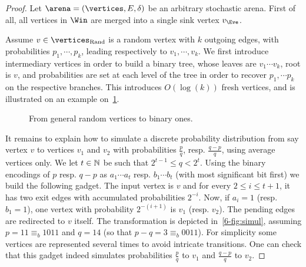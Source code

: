 \begin{proof}
Let $\arena = (\vertices,E,\delta)$ be an arbitrary stochastic
arena. First of all, all vertices in $\Win$ are merged into a single
sink vertex $v_\Eve$.

Assume $v \in \Randomvertices$ is a random vertex with $k$ outgoing
edges, with probabilities $p_1, \cdots, p_k$, leading respectively
to $v_1,\cdots,v_k$. We first introduce intermediary vertices in
order to build a binary tree, whose leaves are $v_1 \cdots v_k$,
root is $v$, and probabilities are set at each level of the tree in
order to recover $p_1, \cdots p_k$ on the respective branches. This
introduces $O(\log(k))$ fresh vertices, and is illustrated on an
example on~\cref{6-fig:gen2binary}.

\begin{figure}[htbp]
  \centering
\caption{From general random vertices to binary ones.}
  \label{6-fig:gen2binary}
\end{figure}

It remains to explain how to simulate a discrete probability
distribution from say vertex $v$ to vertices $v_1$ and $v_2$ with
probabilities $\frac{p}{q}$, resp.  $\frac{q-p}{q}$, using average
vertices only.  We let $t \in\mathbb{N}$ be such that
$2^{t-1} \leq q < 2^{t}$. Using the binary encodings of $p$ resp.
$q-p$ as $a_1 \cdots a_t$ resp. $b_1 \cdots b_t$ (with most
significant bit first) we build the following gadget. The input
vertex is $v$ and for every $2 \leq i \leq t+1$, it has two exit
edges with accumulated probabilities $2^{-i}$. Now, if $a_i=1$
(resp.  $b_1 =1$), one vertex with probability $2^{-(i+1)}$ is $v_1$
(resp. $v_2$). The pending edges are redirected to $v$ itself. The
transformation is depicted in~\cref{6-fig:simul}, assuming
$p=11\equiv_{b} 1011$ and $q=14$ (so that
$p-q = 3 \equiv_{b} 0011$).  For simplicity some vertices are
represented several times to avoid intricate transitions. One can
check that this gadget indeed simulates probabilities $\frac p q$ to
$v_1$ and $\frac {q-p} q$ to $v_2$.


\end{proof}

